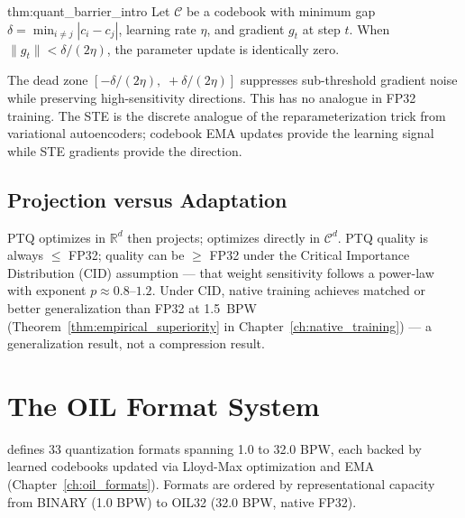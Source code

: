 \begin{mythm}{thm:quant_barrier_intro}
Let $\mathcal{C}$ be a codebook with minimum gap
$\delta = \min_{i \neq j} |c_i - c_j|$, learning rate $\eta$, and gradient
$g_t$ at step $t$. When $\|g_t\| < \delta / (2\eta)$, the parameter update
is identically zero.
\end{mythm}

The dead zone $[-\delta/(2\eta),\; +\delta/(2\eta)]$ suppresses sub-threshold
gradient noise while preserving high-sensitivity directions. This has no
analogue in FP32 training. The STE is the discrete analogue of the
reparameterization trick from variational autoencoders; codebook EMA updates
provide the learning signal while STE gradients provide the direction.

\subsection{Projection versus Adaptation}

PTQ optimizes in $\mathbb{R}^d$ then projects; \OIL{} optimizes directly in
$\mathcal{C}^d$. PTQ quality is always $\leq$ FP32; \OIL{} quality can be
$\geq$ FP32 under the Critical Importance Distribution (CID) assumption ---
that weight sensitivity follows a power-law with exponent $p \approx
0.8$--$1.2$. Under CID, native \OIL{} training achieves matched or better
generalization than FP32 at 1.5~BPW (Theorem~\ref{thm:empirical_superiority}
in Chapter~\ref{ch:native_training}) --- a generalization result, not a
compression result.

\section{The OIL Format System}
\label{sec:oil_format_system}

\OIL{} defines 33 quantization formats spanning 1.0 to 32.0 BPW, each
backed by learned codebooks updated via Lloyd-Max optimization and EMA
(Chapter~\ref{ch:oil_formats}). Formats are ordered by representational
capacity from BINARY (1.0 BPW) to OIL32 (32.0 BPW, native FP32).

